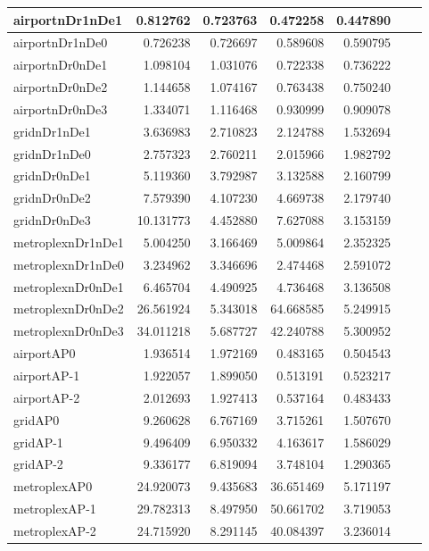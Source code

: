 \begin{longtable}{|l|r|r|r|r|r|r|}
\endlastfoot
airportnDr1nDe1 & 0.812762 & 0.723763 & 0.472258 & 0.447890 \\ \hline
airportnDr1nDe0 & 0.726238 & 0.726697 & 0.589608 & 0.590795 \\ \hline
airportnDr0nDe1 & 1.098104 & 1.031076 & 0.722338 & 0.736222 \\ \hline
airportnDr0nDe2 & 1.144658 & 1.074167 & 0.763438 & 0.750240 \\ \hline
airportnDr0nDe3 & 1.334071 & 1.116468 & 0.930999 & 0.909078 \\ \hline
gridnDr1nDe1 & 3.636983 & 2.710823 & 2.124788 & 1.532694 \\ \hline
gridnDr1nDe0 & 2.757323 & 2.760211 & 2.015966 & 1.982792 \\ \hline
gridnDr0nDe1 & 5.119360 & 3.792987 & 3.132588 & 2.160799 \\ \hline
gridnDr0nDe2 & 7.579390 & 4.107230 & 4.669738 & 2.179740 \\ \hline
gridnDr0nDe3 & 10.131773 & 4.452880 & 7.627088 & 3.153159 \\ \hline
metroplexnDr1nDe1 & 5.004250 & 3.166469 & 5.009864 & 2.352325 \\ \hline
metroplexnDr1nDe0 & 3.234962 & 3.346696 & 2.474468 & 2.591072 \\ \hline
metroplexnDr0nDe1 & 6.465704 & 4.490925 & 4.736468 & 3.136508 \\ \hline
metroplexnDr0nDe2 & 26.561924 & 5.343018 & 64.668585 & 5.249915 \\ \hline
metroplexnDr0nDe3 & 34.011218 & 5.687727 & 42.240788 & 5.300952 \\ \hline
airportAP0 & 1.936514 & 1.972169 & 0.483165 & 0.504543 \\ \hline
airportAP-1 & 1.922057 & 1.899050 & 0.513191 & 0.523217 \\ \hline
airportAP-2 & 2.012693 & 1.927413 & 0.537164 & 0.483433 \\ \hline
gridAP0 & 9.260628 & 6.767169 & 3.715261 & 1.507670 \\ \hline
gridAP-1 & 9.496409 & 6.950332 & 4.163617 & 1.586029 \\ \hline
gridAP-2 & 9.336177 & 6.819094 & 3.748104 & 1.290365 \\ \hline
metroplexAP0 & 24.920073 & 9.435683 & 36.651469 & 5.171197 \\ \hline
metroplexAP-1 & 29.782313 & 8.497950 & 50.661702 & 3.719053 \\ \hline
metroplexAP-2 & 24.715920 & 8.291145 & 40.084397 & 3.236014 \\ \hline

\end{longtable}

